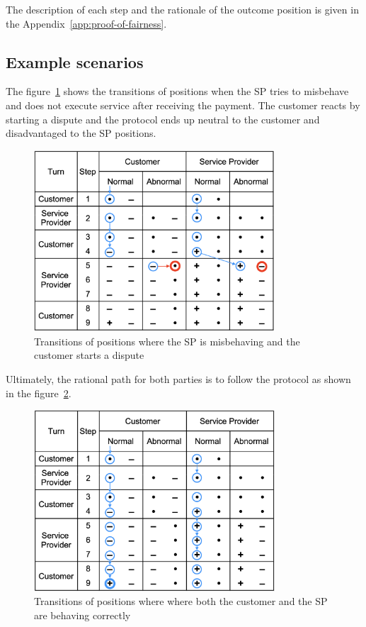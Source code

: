 \documentclass{ieeeaccess}
\begin{document}
The description of each step and the rationale of the outcome position is given in the Appendix~\ref{app:proof-of-fairness}.

\subsection{Example scenarios}\label{example-scenarios}

The figure~\ref{fig:misbehaviour} shows the transitions of positions when the SP tries to misbehave and does not execute service after receiving the payment. The customer reacts by starting a dispute and the protocol ends up neutral to the customer and disadvantaged to the SP positions.

\begin{figure}[h!]
\includegraphics[width=9cm]{formal-misbehaviour-path.png}
\centering
\caption{Transitions of positions where the SP is misbehaving and the customer starts a dispute}
\label{fig:misbehaviour}
\end{figure}

Ultimately, the rational path for both parties is to follow the protocol as shown in the figure~\ref{fig:rational}.

\begin{figure}[h!]
\includegraphics[width=9cm]{formal-rational-path.png}
\centering
\caption{Transitions of positions where where both the customer and the SP are behaving correctly}
\label{fig:rational}
\end{figure}
\end{document}
